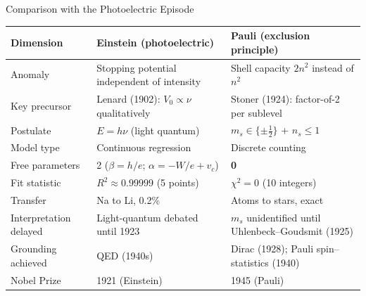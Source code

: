 \documentclass[aspectratio=169,12pt]{beamer}
\begin{document}
\begin{frame}[shrink=20]{Comparison with the Photoelectric Episode}

\begin{center}
\small
\renewcommand{\arraystretch}{1.15}
\begin{tabular}{p{3.3cm}p{5.0cm}p{5.0cm}}
\toprule
\textbf{Dimension} & \textbf{Einstein (photoelectric)} & \textbf{Pauli (exclusion principle)} \\
\midrule
Anomaly & Stopping potential independent of intensity &
  Shell capacity $2n^2$ instead of $n^2$ \\
Key precursor & Lenard (1902): $V_0 \propto \nu$ qualitatively &
  Stoner (1924): factor-of-2 per sublevel \\
Postulate & $E = h\nu$ (light quantum) &
  $m_s\in\{\pm\tfrac{1}{2}\}$ + $n_s\leq 1$ \\
Model type & Continuous regression & Discrete counting \\
Free parameters & 2 ($\beta=h/e$; $\alpha=-W/e+v_c$) & \textbf{0} \\
Fit statistic & $R^2 \approx 0.99999$ (5 points) & $\chi^2 = 0$ (10 integers) \\
Transfer & Na to Li, 0.2\% & Atoms to stars, exact \\
Interpretation delayed & Light-quantum debated until 1923 &
  $m_s$ unidentified until Uhlenbeck--Goudsmit (1925) \\
Grounding achieved & QED (1940s) &
  Dirac (1928); Pauli spin--statistics (1940) \\
Nobel Prize & 1921 (Einstein) & 1945 (Pauli) \\
\bottomrule
\end{tabular}
\end{center}

\end{frame}
\end{document}
